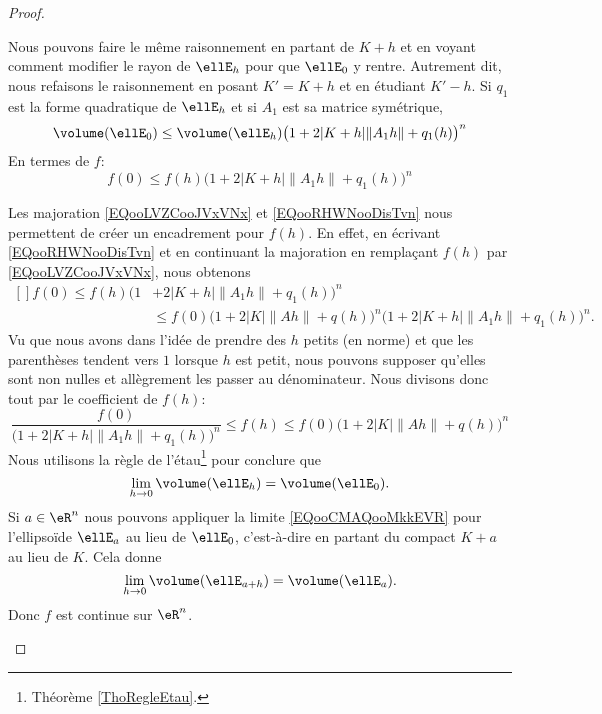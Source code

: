 \begin{proof}
\begin{subproof}
		Nous pouvons faire le même raisonnement en partant de \( K+h\) et en voyant comment modifier le rayon de \( \ellE_h\) pour que \( \ellE_0\) y rentre. Autrement dit, nous refaisons le raisonnement en posant \( K'=K+h\) et en étudiant \( K'-h\). Si \( q_1\) est la forme quadratique de \( \ellE_h\) et si \( A_1\) est sa matrice symétrique,
		\begin{equation}
			\volume(\ellE_0)\leq \volume(\ellE_h)\big( 1+2| K+h |\| A_1h \|+q_1(h) \big)^n
		\end{equation}
		En termes de \( f\):
		\begin{equation}        \label{EQooRHWNooDisTvn}
			f(0)\leq f(h) \big( 1+2| K+h |\| A_1h \|+q_1(h) \big)^n
		\end{equation}
		\spitem[Encadrement]

		Les majoration \eqref{EQooLVZCooJVxVNx} et \eqref{EQooRHWNooDisTvn} nous permettent de créer un encadrement pour \( f(h)\). En effet, en écrivant \eqref{EQooRHWNooDisTvn} et en continuant la majoration en remplaçant \( f(h)\) par \eqref{EQooLVZCooJVxVNx}, nous obtenons
		\begin{equation}
			\begin{aligned}[]
				f(0)\leq f(h) \big( 1 & +2| K+h |\| A_1h \|+q_1(h) \big)^n                                                      \\
				                      & \leq f(0)\big( 1+2| K |\| Ah \|+q(h) \big)^n \big( 1+2| K+h |\| A_1h \|+q_1(h) \big)^n.
			\end{aligned}
		\end{equation}
		Vu que nous avons dans l'idée de prendre des \( h\) petits (en norme) et que les parenthèses tendent vers \( 1\) lorsque \( h\) est petit, nous pouvons supposer qu'elles sont non nulles et allègrement les passer au dénominateur. Nous divisons donc tout par le coefficient de \( f(h)\):
		\begin{equation}
			\frac{ f(0) }{  \big( 1+2| K+h |\| A_1h \|+q_1(h) \big)^n }\leq f(h)\leq f(0)  \big( 1+2| K |\| Ah \|+q(h) \big)^n
		\end{equation}
		Nous utilisons la règle de l'étau\footnote{Théorème \ref{ThoRegleEtau}.} pour conclure que
		\begin{equation}        \label{EQooCMAQooMkkEVR}
			\lim_{h\to 0} \volume(\ellE_h)=\volume(\ellE_0).
		\end{equation}
		\spitem[Continuité]
		Si \( a\in \eR^n\) nous pouvons appliquer la limite \eqref{EQooCMAQooMkkEVR} pour l'ellipsoïde \( \ellE_a\) au lieu de \( \ellE_0\), c'est-à-dire en partant du compact \( K+a\) au lieu de \( K\). Cela donne
		\begin{equation}
			\lim_{h\to 0} \volume(\ellE_{a+h})=\volume(\ellE_a).
		\end{equation}
		Donc \( f\) est continue sur \( \eR^n\).


\end{subproof}
\end{proof}
